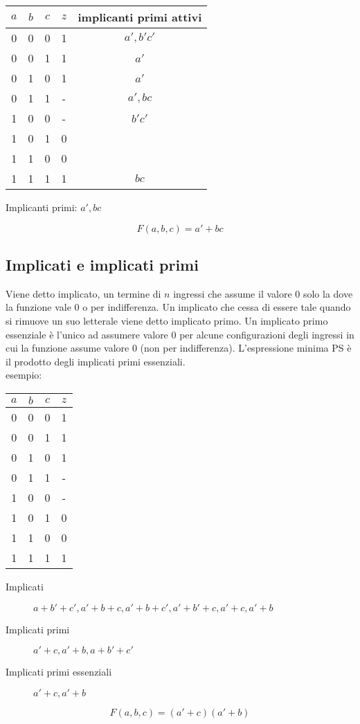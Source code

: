 \documentclass{subfiles}
\begin{document}
\begin{center}
\begin{tabular}{ |c|c|c|c|c| }
\hline
$a$ & $b$ & $c$ & $z$ & implicanti primi attivi \\
\hline
\hline
0 & 0 & 0 & 1 & $a', b'c'$ \\
0 & 0 & 1 & 1 & $a'$ \\
0 & 1 & 0 & 1 & $a'$ \\
0 & 1 & 1 & - & $a', bc$ \\
1 & 0 & 0 & - & $b'c'$ \\
1 & 0 & 1 & 0 & \\
1 & 1 & 0 & 0 & \\
1 & 1 & 1 & 1 & $bc$ \\
\hline
\end{tabular}
\end{center}

\noindent
Implicanti primi: $a', bc$

$$
F(a,b,c) = a' + bc
$$

\subsection{Implicati e implicati primi}

Viene detto implicato, un termine di $n$ ingressi che assume il valore 0 solo la dove la funzione vale 0 o per indifferenza.
Un implicato che cessa di essere tale quando si rimuove un suo letterale viene detto implicato primo.
Un implicato primo essenziale è l'unico ad assumere valore 0 per alcune configurazioni degli ingressi in cui la funzione assume valore 0 (non per indifferenza).
L'espressione minima PS è il prodotto degli implicati primi essenziali.\\

\noindent
esempio:

\begin{center}
\begin{tabular}{ |c|c|c|c| }
\hline
$a$ & $b$ & $c$ & $z$ \\
\hline
\hline
0 & 0 & 0 & 1 \\
0 & 0 & 1 & 1 \\
0 & 1 & 0 & 1 \\
0 & 1 & 1 & - \\
1 & 0 & 0 & - \\
1 & 0 & 1 & 0 \\
1 & 1 & 0 & 0 \\
1 & 1 & 1 & 1 \\
\hline
\end{tabular}
\end{center}

\begin{description}
    \item[Implicati] $a+b'+c', a'+b+c, a'+b+c', a'+b'+c, a'+c, a'+b$
    \item[Implicati primi] $a'+c, a'+b, a+b'+c'$
    \item[Implicati primi essenziali] $a'+c, a'+b$
\end{description}

$$
F(a,b,c) = (a'+c)(a'+b)
$$
\end{document}
